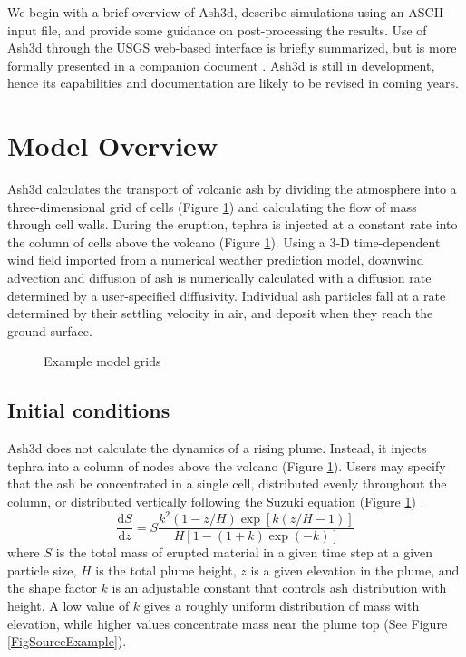 We begin with a brief overview of Ash3d, describe simulations using an ASCII input file, and provide some guidance on post-processing the results. Use of Ash3d through the USGS web-based interface is briefly summarized, but is more formally presented in a companion document \cite{Mastin20}. Ash3d is still in development, hence its capabilities and documentation are likely to be revised in coming years.

\section{Model Overview}\label{ChapIntroSecModelOverview}
Ash3d calculates the transport of volcanic ash by dividing the atmosphere into a
three-dimensional grid of cells (Figure \ref{FigAsh3dGrid}) and calculating the flow of mass through cell walls. During the eruption, tephra is injected at a constant
rate into the column of cells above the volcano (Figure \ref{FigAsh3dGrid}).
Using a 3-D time-dependent wind field imported from a numerical weather prediction model, downwind advection and diffusion of ash is numerically calculated with a
diffusion rate determined by a user-specified diffusivity. Individual ash
particles fall at a rate determined by their settling velocity in air, and
deposit when they reach the ground surface.
\begin{figure}[htbp]
\parbox{15cm}{\caption{\label{FigAsh3dGrid}
Example model grids}}
\end{figure}

\subsection{Initial conditions}\label{ChapIntroSecInitCond}
Ash3d does not calculate the dynamics of a rising plume. Instead, it injects
tephra into a column of nodes above the volcano (Figure \ref{FigAsh3dGrid}).
Users may specify
that the ash be concentrated in a single cell, distributed evenly throughout
the column, or distributed vertically following the Suzuki equation
(Figure \ref{FigAsh3dGrid}) \cite{Carey96,Suzuki83}.
\begin{equation}
 \frac{\mathrm{d}S}{\mathrm{d}z} = S\frac{k^2\left( 1-z/H \right)\exp\left[k\left(z/H-1 \right) \right]}
 {H \left[1-\left(1+k \right)\exp \left( -k\right) \right]} \label{EqSuz}
\end{equation}
where $S$ is the total mass of erupted material in a given time step at a
given particle size, $H$ is the total plume height, $z$ is a given elevation
in the plume, and the shape factor $k$ is an adjustable constant that controls
ash distribution with height. A low value of $k$ gives a roughly uniform
distribution of mass with elevation, while higher values concentrate mass
near the plume top (See Figure \ref{FigSourceExample}).

